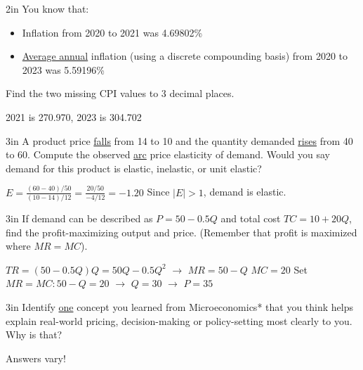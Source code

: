 \documentclass[12pt]{exam}
\begin{document}
\begin{questions}
\begin{problem}[10]{2in}
    You know that:
    \begin{itemize}
      \item Inflation from 2020 to 2021 was 4.69802\%
      \item \underline{Average annual} inflation (using a discrete compounding basis) from
        2020 to 2023 was 5.59196\%
    \end{itemize}

    Find the two missing CPI values to 3 decimal places.
  \end{problem}
  \begin{solution}
    2021 is 270.970, 2023 is 304.702
  \end{solution}

  \begin{problem}[10]{3in}
    A product price \underline{falls} from 14 to 10 and the quantity demanded \underline{rises}
    from 40 to 60. Compute the observed \underline{arc} price elasticity of demand.  Would you say
    demand for this product is elastic, inelastic, or unit elastic?
  \end{problem}
  \begin{solution}
    $E = \frac{(60-40)/50}{(10-14)/12} = \frac{20/50}{-4/12} = -1.20$
    Since $|E| > 1$, demand is elastic.
  \end{solution}

  \begin{problem}[10]{3in}
    If demand can be described as $P = 50 - 0.5Q$ and total cost $TC = 10 + 20Q$, find the
    profit-maximizing output and price. (Remember that profit is maximized where $MR = MC$).
  \end{problem}
  \begin{solution}
    $TR = (50-0.5Q)Q = 50Q - 0.5Q^2$ $\rightarrow$ $MR = 50 - Q$
    $MC = 20$
    Set $MR = MC: 50 - Q = 20$ $\rightarrow$ $Q = 30$ $\rightarrow$ $P = 35$
  \end{solution}


  \begin{shortanswer}[5]{3in}
    Identify \underline{one} concept you learned from Microeconomics* that you think helps
    explain real-world pricing, decision-making or policy-setting most clearly to you.  Why is that?
  \end{shortanswer}
  \begin{solution}
    Answers vary!
  \end{solution}

\end{questions}
\end{document}
